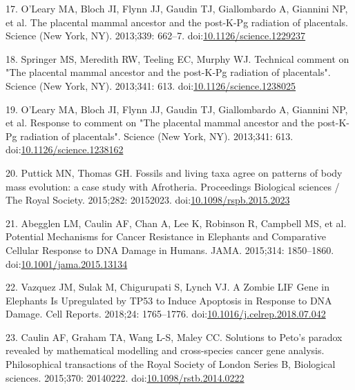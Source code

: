 \documentclass[]{elsarticle} %
\begin{document}
\leavevmode\hypertarget{ref-OLeary2013a}{}%
17. O'Leary MA, Bloch JI, Flynn JJ, Gaudin TJ, Giallombardo A, Giannini
NP, et al. The placental mammal ancestor and the post-K-Pg radiation of
placentals. Science (New York, NY). 2013;339: 662--7.
doi:\href{https://doi.org/10.1126/science.1229237}{10.1126/science.1229237}

\leavevmode\hypertarget{ref-Springer2013}{}%
18. Springer MS, Meredith RW, Teeling EC, Murphy WJ. Technical comment
on "The placental mammal ancestor and the post-K-Pg radiation of
placentals". Science (New York, NY). 2013;341: 613.
doi:\href{https://doi.org/10.1126/science.1238025}{10.1126/science.1238025}

\leavevmode\hypertarget{ref-OLeary2013b}{}%
19. O'Leary MA, Bloch JI, Flynn JJ, Gaudin TJ, Giallombardo A, Giannini
NP, et al. Response to comment on "The placental mammal ancestor and the
post-K-Pg radiation of placentals". Science (New York, NY). 2013;341:
613.
doi:\href{https://doi.org/10.1126/science.1238162}{10.1126/science.1238162}

\leavevmode\hypertarget{ref-PuttickAndThomas2015}{}%
20. Puttick MN, Thomas GH. Fossils and living taxa agree on patterns of
body mass evolution: a case study with Afrotheria. Proceedings
Biological sciences / The Royal Society. 2015;282: 20152023.
doi:\href{https://doi.org/10.1098/rspb.2015.2023}{10.1098/rspb.2015.2023}

\leavevmode\hypertarget{ref-Abegglen:JAMA2015}{}%
21. Abegglen LM, Caulin AF, Chan A, Lee K, Robinson R, Campbell MS, et
al. Potential Mechanisms for Cancer Resistance in Elephants and
Comparative Cellular Response to DNA Damage in Humans. JAMA. 2015;314:
1850--1860.
doi:\href{https://doi.org/10.1001/jama.2015.13134}{10.1001/jama.2015.13134}

\leavevmode\hypertarget{ref-Vazquez2018}{}%
22. Vazquez JM, Sulak M, Chigurupati S, Lynch VJ. A Zombie LIF Gene in
Elephants Is Upregulated by TP53 to Induce Apoptosis in Response to DNA
Damage. Cell Reports. 2018;24: 1765--1776.
doi:\href{https://doi.org/10.1016/j.celrep.2018.07.042}{10.1016/j.celrep.2018.07.042}

\leavevmode\hypertarget{ref-Caulin2015}{}%
23. Caulin AF, Graham TA, Wang L-S, Maley CC. Solutions to Peto's
paradox revealed by mathematical modelling and cross-species cancer gene
analysis. Philosophical transactions of the Royal Society of London
Series B, Biological sciences. 2015;370: 20140222.
doi:\href{https://doi.org/10.1098/rstb.2014.0222}{10.1098/rstb.2014.0222}
\end{document}
